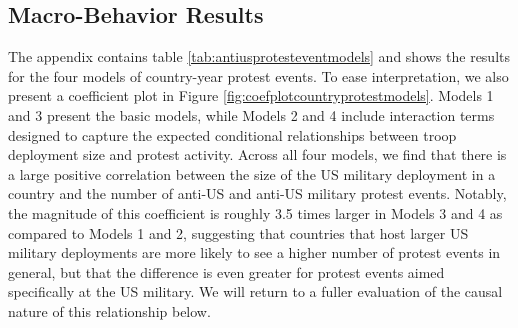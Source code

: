 			\subsection*{Macro-Behavior Results}
			
			The appendix contains table \ref{tab:antiusprotesteventmodels} and shows the results for the four models of country-year protest events. To ease interpretation, we also present a coefficient plot in Figure \ref{fig:coefplotcountryprotestmodels}. Models 1 and 3 present the basic models, while Models 2 and 4 include interaction terms designed to capture the expected conditional relationships between troop deployment size and protest activity. Across all four models, we find that there is a large positive correlation between the size of the US military deployment in a country and the number of anti-US and anti-US military protest events. Notably, the magnitude of this coefficient is roughly 3.5 times larger in Models 3 and 4 as compared to Models 1 and 2, suggesting that countries that host larger US military deployments are more likely to see a higher number of protest events in general, but that the difference is even greater for protest events aimed specifically at the US military. We will return to a fuller evaluation of the causal nature of this relationship below.
			
			
			
